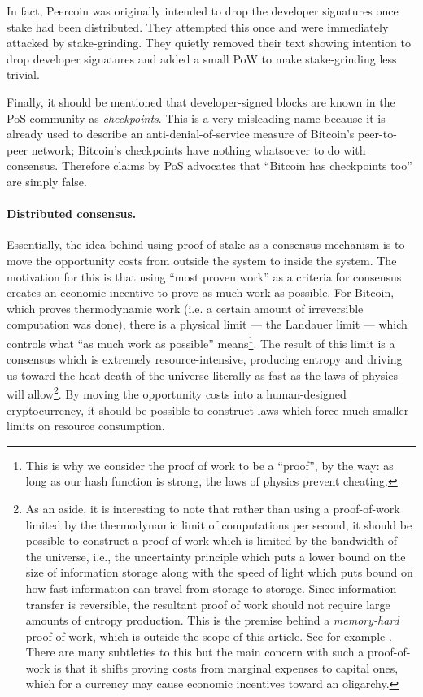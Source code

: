 \documentclass[letterpaper]{article}
\begin{document}
In fact, Peercoin was originally intended to drop the developer signatures once stake
had been distributed. They attempted this once and were immediately attacked by stake-grinding.
They quietly removed their text showing intention to drop developer signatures and added
a small PoW to make stake-grinding less trivial.

Finally, it should be mentioned that developer-signed blocks are known in the PoS
community as \emph{checkpoints}. This is a very misleading name because it is already
used to describe an anti-denial-of-service measure of Bitcoin's peer-to-peer network;
Bitcoin's checkpoints have nothing whatsoever to do with consensus. Therefore claims
by PoS advocates that ``Bitcoin has checkpoints too'' are simply false.

\paragraph{Distributed consensus.}
Essentially, the idea behind using proof-of-stake as a consensus mechanism is to
move the opportunity costs from outside the system to inside the system. The
motivation for this is that using ``most proven work'' as a criteria for consensus
creates an economic incentive to prove as much work as possible. For Bitcoin, which
proves thermodynamic work (i.e. a certain amount of irreversible computation was
done), there is a physical limit --- the Landauer limit --- which controls what
``as much work as possible'' means\footnote{This is why we consider the proof of work to
be a ``proof'', by the way: as long as our hash function is strong, the laws of
physics prevent cheating.}. The result
of this limit is a consensus which is
extremely resource-intensive, producing entropy and driving us toward the heat death
of the universe literally as fast as the laws of physics will allow\footnote{As an
aside, it is interesting
to note that rather than using a proof-of-work limited
by the thermodynamic limit of computations per second, it should be possible to
construct a proof-of-work which is limited by the bandwidth of the universe, i.e.,
the uncertainty principle which puts a lower bound on the size of information storage
along with the speed of light which puts bound on how fast information can travel from
storage to storage. Since information transfer is reversible, the resultant proof of
work should not require large amounts of entropy production. This is the premise behind a
\emph{memory-hard} proof-of-work, which is outside the scope of this article. See
for example \cite{tromp}. There are many subtleties to this but the main
concern with such a proof-of-work is that it shifts proving costs from marginal
expenses to capital ones, which for a currency may cause economic incentives toward
an oligarchy.}.
By moving the opportunity costs into a human-designed cryptocurrency, it should be
possible to construct laws which force much smaller limits on resource consumption.
\end{document}
